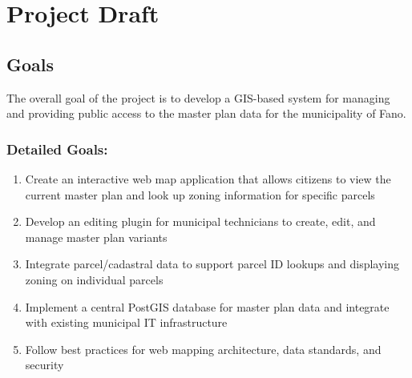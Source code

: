 
\chapter{Project Draft}
\label{chp:working_hypotheses}

\section{Goals}
The overall goal of the project is to develop a GIS-based system for managing and providing public access to the master plan data for the municipality of Fano.

\subsection{Detailed Goals:}
\begin{enumerate}
    \item Create an interactive web map application that allows citizens to view the current master plan and look up zoning information for specific parcels
    \item Develop an editing plugin for municipal technicians to create, edit, and manage master plan variants
    \item Integrate parcel/cadastral data to support parcel ID lookups and displaying zoning on individual parcels
    \item Implement a central PostGIS database for master plan data and integrate with existing municipal IT infrastructure
    \item Follow best practices for web mapping architecture, data standards, and security
\end{enumerate}


